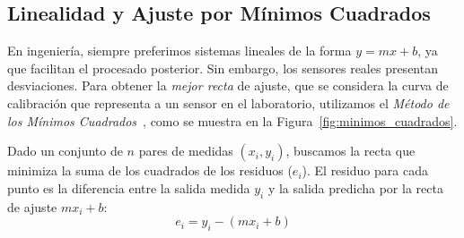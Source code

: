 \subsection{Linealidad y Ajuste por Mínimos Cuadrados}

En ingeniería, siempre preferimos sistemas lineales de la forma $y = mx + b$, ya que facilitan el procesado posterior. Sin embargo, los sensores reales presentan desviaciones. Para obtener la \emph{mejor recta} de ajuste, que se considera la curva de calibración que representa a un sensor en el laboratorio, utilizamos el \emph{Método de los Mínimos Cuadrados}~\cite{taylor1997erroranalysis}, como se muestra en la Figura~\ref{fig:minimos_cuadrados}.
\begin{marginfigure}
    \centering
    \caption[Ajuste lineal por mínimos cuadrados.]{Ajuste lineal por mínimos cuadrados. La recta minimiza la distancia vertical al cuadrado de cada punto experimental.}\label{fig:minimos_cuadrados}
\end{marginfigure}

Dado un conjunto de $n$ pares de medidas $(x_i, y_i)$, buscamos la recta que minimiza la suma de los cuadrados de los residuos ($e_i$). El residuo para cada punto es la diferencia entre la salida medida $y_i$ y la salida predicha por la recta de ajuste $mx_i + b$:
\[ e_i = y_i - (mx_i + b) \]

